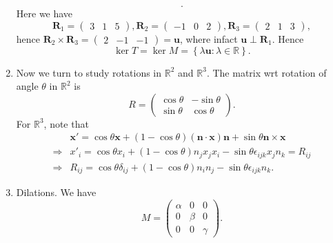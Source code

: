 \documentclass[10pt]{article}
\begin{document}
\begin{example}
\begin{enumerate}[(1)]
\[            .\]
            Here we have
            \[
                \mathbf{R}_1=\begin{pmatrix}
                    3&1&5
                \end{pmatrix},\mathbf{R}_2=\begin{pmatrix}
                    -1&0&2
                \end{pmatrix},\mathbf{R}_3=\begin{pmatrix}
                    2&1&3
                \end{pmatrix}
            ,\]
            hence $ \mathbf{R}_2 \times \mathbf{R}_3 = \begin{pmatrix}
                2&-1&-1
            \end{pmatrix}=\mathbf{u} $, where infact $ \mathbf{u} \perp \mathbf{R}_1 $. Hence 
            \[
                \ker T=\ker M=\left\{ \lambda \mathbf{u}:\lambda\in \mathbb{R}\right\}
            .\]
            \item Now we turn to study rotations in $ \mathbb{R}^{2} $ and $ \mathbb{R}^{3} $. The matrix wrt rotation of angle $ \theta $ in $ \mathbb{R}^{2} $ is
            \[
                R=\begin{pmatrix}
                    \cos \theta&-\sin \theta\\
                    \sin \theta&\cos \theta
                \end{pmatrix}
            .\]
            For $ \mathbb{R}^{3} $, note that 
            \[
                \begin{aligned}
                     &\mathbf{x}'=\cos \theta \mathbf{x}+(1-\cos \theta)(\mathbf{n}\cdot \mathbf{x})\mathbf{n}+\sin \theta \mathbf{n}\times \mathbf{x}\\
                     \Longrightarrow &x'_i= \cos \theta x_i+(1-\cos \theta)n_jx_jx_i-\sin \theta \epsilon_{ijk}x_j n_k=R_{ij}\\
                     \Longrightarrow & R_{ij}=\cos \theta \delta_{ij}+(1-\cos \theta)n_in_j-\sin \theta \epsilon_{ijk} n_k.
                \end{aligned}
            \]
            \item Dilations. We have 
            \[
                M=\begin{pmatrix}
                    \alpha&0&0\\
                    0&\beta&0\\
                    0&0&\gamma
                \end{pmatrix}
            .\]

\end{enumerate}
\end{example}
\end{document}
